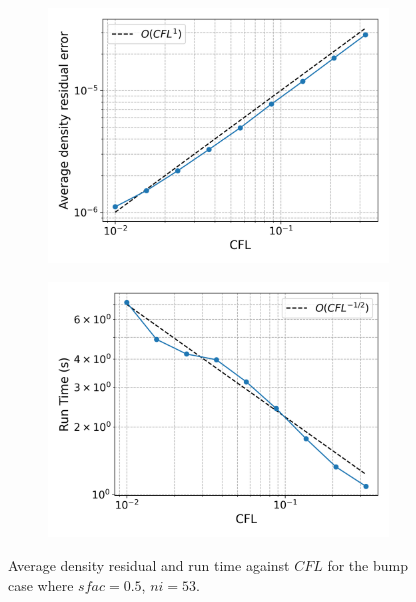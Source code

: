 \documentclass{article}
\begin{document}
\begin{figure}[H]
    \centering
    \begin{subfigure}{0.49\textwidth}
        \centering
        \includegraphics[width=0.99\textwidth]{figures/bump_d_avg_cfl.png}
        \caption{}
        \label{fig:bump_d_avg_cfl}
    \end{subfigure}
    \begin{subfigure}{0.49\textwidth}
        \centering
        \includegraphics[width=0.99\textwidth]{figures/bump_time_cfl.png}
        \caption{}
        \label{fig:bump_time_cfl}
    \end{subfigure}
    
    \caption{Average density residual and run time against $CFL$ for the bump case where $sfac = 0.5$, $ni = 53$.}
\end{figure}
\end{document}
